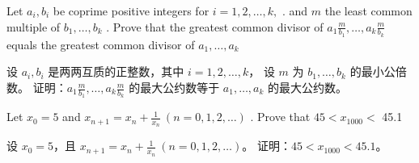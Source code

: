 \documentclass[a4paper]{article}
\begin{document}
Let $a_{i}, b_{i}$ be coprime positive integers for $i=1, 2, \ldots, k,$ .
and $m$ the least common multiple of $b_{1}, \ldots, b_{k}$ . 
Prove that the greatest common divisor of $a_{1} \frac{m} {b_{1}}, \dots, a_{k} \frac{m}{b_{k}}$ 
equals the greatest common divisor of $a_{1}, \ldots, a_{k}$

设 $a_{i}, b_{i}$ 是两两互质的正整数，其中 $i=1, 2, \ldots, k$，
设 $m$ 为 $b_{1}, \ldots, b_{k}$ 的最小公倍数。
证明：$a_{1} \frac{m}{b_{1}}, \dots, a_{k} \frac{m}{b_{k}}$ 的最大公约数等于 $a_{1}, \ldots, a_{k}$ 的最大公约数。

Let $x_{0}=5$ and $x_{n+1}=x_{n}+\frac{1} {x_{n}} ~ ( n=0, 1, 2, \ldots)$ . Prove that $4 5 < x_{1 0 0 0} <$ 45.1

设 $x_{0}=5$，且 $x_{n+1}=x_{n}+\frac{1}{x_{n}} ~ (n=0, 1, 2, \ldots)$。
证明：$45 < x_{1000} < 45.1$。
\end{document}
